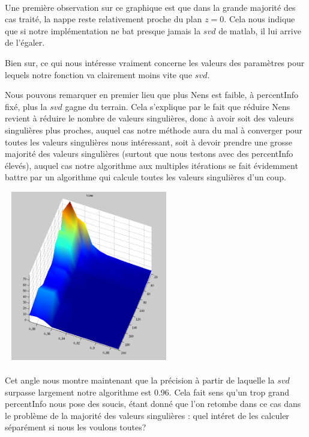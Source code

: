 \documentclass[a4paper,12pt]{article}
\begin{document}
    \paragraph{}
    Une première observation sur ce graphique est que dans la grande majorité
    des cas traité, la nappe reste relativement proche du plan $z=0$. Cela
    nous indique que si notre implémentation ne bat presque jamais la $svd$
    de matlab, il lui arrive de l'égaler.

    Bien sur, ce qui nous intéresse vraiment concerne les valeurs des paramètres
    pour lequels notre fonction va clairement moins vite que $svd$.

    Nous pouvons remarquer en premier lieu que plus Nens est faible, à percentInfo
    fixé, plus la $svd$ gagne du terrain. Cela s'explique par le fait que réduire
    Nens revient à réduire le nombre de valeurs singulières, donc à avoir soit des
    valeurs singulières plus proches, auquel cas notre méthode aura du mal à
    converger pour toutes les valeurs singulières nous intéressant, soit à devoir
    prendre une grosse majorité des valeurs singulières (surtout que nous testons
    avec des percentInfo élevés), auquel cas notre algorithme aux multiples itérations
    se fait évidemment battre par un algorithme qui calcule toutes les valeurs
    singulières d'un coup.

    \bigskip
    \begin{center}
    \includegraphics[width=20em, height=20em]{time2.png}
    \end{center}

    \paragraph{}
    Cet angle nous montre maintenant que la précision à partir de laquelle la $svd$
    surpasse largement notre algorithme est 0.96. Cela fait sens qu'un trop grand
    percentInfo nous pose des soucis, étant donné que l'on retombe dans ce cas
    dans le problème de la majorité des valeurs singulières : quel intéret de les
    calculer séparément si nous les voulons toutes?
\end{document}
